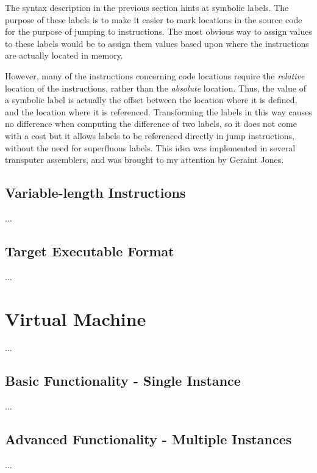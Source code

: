 The syntax description in the previous section hints at symbolic labels. The
purpose of these labels is to make it easier to mark locations in the source
code for the purpose of jumping to instructions. The most obvious way to assign
values to these labels would be to assign them values based upon where the
instructions are actually located in memory.

However, many of the instructions concerning code locations require the
\textit{relative} location of the instructions, rather than the
\textit{absolute} location. Thus, the value of a symbolic label is actually the
offset between the location where it is defined, and the location where it is
referenced. Transforming the labels in this way causes no difference when
computing the difference of two labels, so it does not come with a cost but it
allows labels to be referenced directly in jump instructions, without the need
for superfluous labels. This idea was implemented in several transputer
assemblers, and was brought to my attention by Geraint Jones.

\subsection{Variable-length Instructions}

...

\subsection{Target Executable Format}

...

\section{Virtual Machine}

...

\subsection{Basic Functionality - Single Instance}

...

\subsection{Advanced Functionality - Multiple Instances}

...
